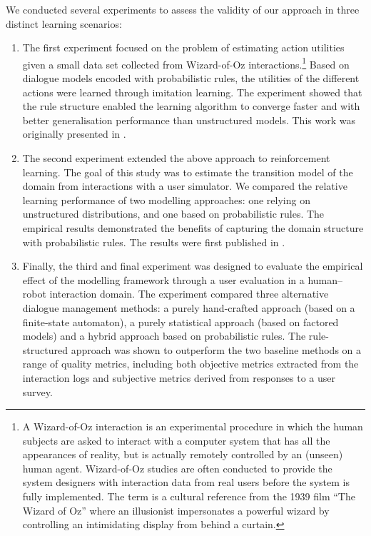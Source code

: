 We conducted several experiments to assess the validity of our approach in three distinct learning scenarios: \begin{enumerate} %

\item The first experiment focused on the problem of estimating action utilities given a small data set collected from Wizard-of-Oz interactions.\footnote{A Wizard-of-Oz interaction is an experimental procedure in which the human subjects are asked to interact with a computer system that has all the appearances of reality, but is actually remotely controlled by an (unseen) human agent.  Wizard-of-Oz studies are often conducted to provide the system designers with interaction data from real users before the system is fully implemented.  The term is a cultural reference from the 1939 film ``The Wizard of Oz'' where an illusionist impersonates a powerful wizard by controlling an intimidating display from behind a curtain.}  Based on dialogue models encoded with probabilistic rules, the utilities of the different actions were learned through imitation learning. The experiment showed that the rule structure enabled the learning algorithm to converge faster and with better generalisation performance than unstructured models. This work was originally presented in \cite{rulebasedmodels-sigdial2012}. 
\item The second experiment extended the above approach to reinforcement learning. The goal of this study was to estimate the transition model of the domain from interactions with a user simulator. We compared the relative learning performance of two modelling approaches: one relying on unstructured distributions, and one based on probabilistic rules. The empirical results demonstrated the benefits of capturing the domain structure with probabilistic rules. The results were first published in \cite{interspeech2013}. 
\item Finally, the third and final experiment was designed to evaluate the empirical effect of the modelling framework through a user evaluation in a human--robot interaction domain. The experiment compared three alternative dialogue management methods: a purely hand-crafted approach (based on a finite-state automaton), a purely statistical approach (based on factored models) and a hybrid approach based on probabilistic rules. The rule-structured approach was shown to outperform the two baseline methods on a range of quality metrics, including both objective metrics extracted from the interaction logs and subjective metrics derived from responses to a user survey. 
\end{enumerate}

